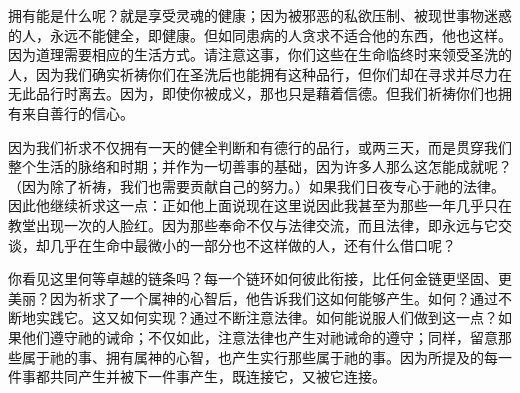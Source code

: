 拥有能是什么呢？就是享受灵魂的健康；因为被邪恶的私欲压制、被现世事物迷惑的人，永远不能健全，即健康。但如同患病的人贪求不适合他的东西，他也这样。因为道理需要相应的生活方式。请注意这事，你们这些在生命临终时来领受圣洗的人，因为我们确实祈祷你们在圣洗后也能拥有这种品行，但你们却在寻求并尽力在无此品行时离去。因为，即使你被成义，那也只是藉着信德。但我们祈祷你们也拥有来自善行的信心。\par

因为我们祈求不仅拥有一天的健全判断和有德行的品行，或两三天，而是贯穿我们整个生活的脉络和时期；并作为一切善事的基础，因为许多人那么这怎能成就呢？（因为除了祈祷，我们也需要贡献自己的努力。）如果我们日夜专心于祂的法律。因此他继续祈求这一点：正如他上面说现在这里说因此我甚至为那些一年几乎只在教堂出现一次的人脸红。因为那些奉命不仅与法律交流，而且法律，即永远与它交谈，却几乎在生命中最微小的一部分也不这样做的人，还有什么借口呢？\par

你看见这里何等卓越的链条吗？每一个链环如何彼此衔接，比任何金链更坚固、更美丽？因为祈求了一个属神的心智后，他告诉我们这如何能够产生。如何？通过不断地实践它。这又如何实现？通过不断注意法律。如何能说服人们做到这一点？如果他们遵守祂的诫命；不仅如此，注意法律也产生对祂诫命的遵守；同样，留意那些属于祂的事、拥有属神的心智，也产生实行那些属于祂的事。因为所提及的每一件事都共同产生并被下一件事产生，既连接它，又被它连接。\par

